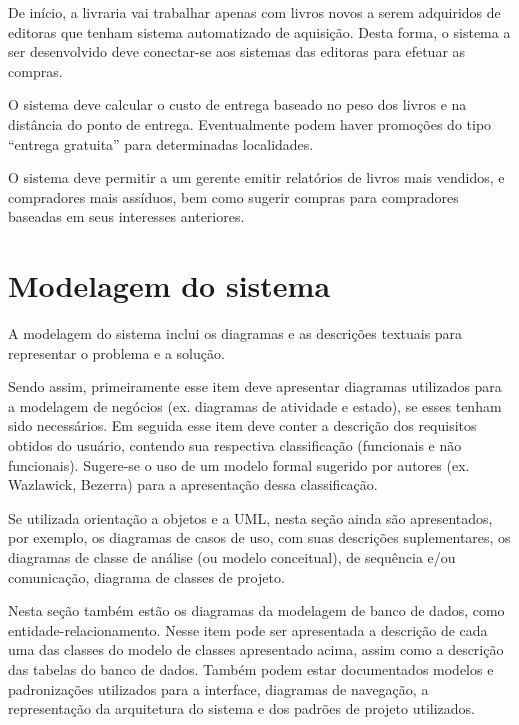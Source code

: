 De início, a livraria vai trabalhar apenas com livros novos a serem adquiridos de editoras que tenham sistema automatizado de aquisição. Desta forma, o sistema a ser desenvolvido deve conectar-se aos sistemas das editoras para efetuar as compras.

O sistema deve calcular o custo de entrega baseado no peso dos livros e na distância do ponto de entrega. Eventualmente podem haver promoções do tipo “entrega gratuita” para determinadas localidades.

O sistema deve permitir a um gerente emitir relatórios de livros mais vendidos, e compradores mais assíduos, bem como sugerir compras para compradores baseadas em seus interesses anteriores.

\section{Modelagem do sistema}\label{sec:modelagemSistema}

A modelagem do sistema inclui os diagramas e as descrições textuais para representar o problema e a solução.

Sendo assim, primeiramente esse item deve apresentar diagramas utilizados para a modelagem de negócios (ex. diagramas de atividade e estado), se esses tenham sido necessários.
Em seguida esse item deve conter a descrição dos requisitos obtidos do usuário, contendo sua respectiva classificação (funcionais e não funcionais). Sugere-se o uso de um modelo formal sugerido por autores (ex. Wazlawick, Bezerra) para a apresentação dessa classificação.

Se utilizada orientação a objetos e a UML, nesta seção ainda são apresentados, por exemplo, os diagramas de casos de uso, com suas descrições suplementares, os diagramas de classe de análise (ou modelo conceitual), de sequência e/ou comunicação, diagrama de classes de projeto.

Nesta seção também estão os diagramas da modelagem de banco de dados, como entidade-relacionamento. Nesse item pode ser apresentada a descrição de cada uma das classes do modelo de classes apresentado acima, assim como a descrição das tabelas do banco de dados. Também podem estar documentados modelos e padronizações utilizados para a interface, diagramas de navegação, a representação da arquitetura do sistema e dos padrões de projeto utilizados.

